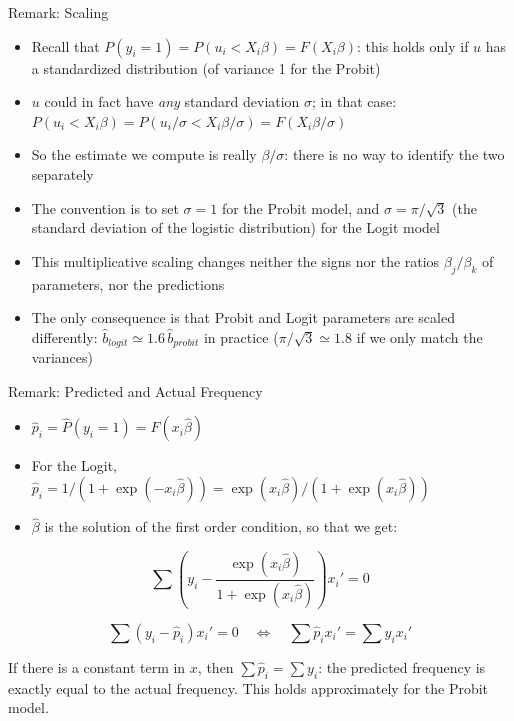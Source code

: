\documentclass[aspectratio=169]{beamer}
\begin{document}
\begin{frame}{Remark: Scaling}
\begin{itemize}
    \item Recall that $P(y_i = 1) = P(u_i < X_i\beta) = F(X_i\beta)$: this holds only if $u$ has a standardized distribution (of variance 1 for the Probit)
    \item $u$ could in fact have \textit{any} standard deviation $\sigma$; in that case: $P(u_i < X_i\beta) = P(u_i/\sigma < X_i\beta/\sigma) = F(X_i\beta/\sigma)$
    \item So the estimate we compute is really $\beta/\sigma$: there is no way to identify the two separately
    \item The convention is to set $\sigma = 1$ for the Probit model, and $\sigma = \pi/\sqrt{3}$ (the standard deviation of the logistic distribution) for the Logit model
    \item This multiplicative scaling changes neither the signs nor the ratios $\beta_j/\beta_k$ of parameters, nor the predictions
    \item The only consequence is that Probit and Logit parameters are scaled differently: $\hat{b}_{logit} \simeq 1.6\,\hat{b}_{probit}$ in practice ($\pi/\sqrt{3} \simeq 1.8$ if we only match the variances)
\end{itemize}
\end{frame}

\begin{frame}{Remark: Predicted and Actual Frequency}
\begin{itemize}
    \item $\hat{p}_i = \hat{P}(y_i = 1) = F(x_i\hat{\beta})$
    \item For the Logit, $\hat{p}_i = 1/(1 + \exp(-x_i\hat{\beta})) = \exp(x_i\hat{\beta})/(1 + \exp(x_i\hat{\beta}))$
    \item $\hat{\beta}$ is the solution of the first order condition, so that we get:
\end{itemize}

\[\sum\left(y_i - \frac{\exp(x_i\hat{\beta})}{1 + \exp(x_i\hat{\beta})}\right)x_i' = 0\]

\[\sum(y_i - \hat{p}_i)x_i' = 0 \quad\Longleftrightarrow\quad \sum \hat{p}_i x_i' = \sum y_i x_i'\]

If there is a constant term in $x$, then $\sum \hat{p}_i = \sum y_i$: the predicted frequency is exactly equal to the actual frequency. This holds approximately for the Probit model.
\end{frame}
\end{document}
